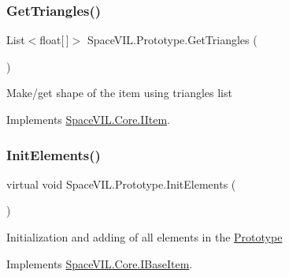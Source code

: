\subsubsection{\texorpdfstring{Get\+Triangles()}{GetTriangles()}}
{\footnotesize\ttfamily List$<$float\mbox{[}$\,$\mbox{]}$>$ Space\+V\+I\+L.\+Prototype.\+Get\+Triangles (\begin{DoxyParamCaption}{ }\end{DoxyParamCaption})}



Make/get shape of the item using triangles list 



Implements \mbox{\hyperlink{interface_space_v_i_l_1_1_core_1_1_i_item}{Space\+V\+I\+L.\+Core.\+I\+Item}}.

\mbox{\label{class_space_v_i_l_1_1_prototype_ac3379fe02923ee155b5b0084abf27420}} 
\subsubsection{\texorpdfstring{Init\+Elements()}{InitElements()}}
{\footnotesize\ttfamily virtual void Space\+V\+I\+L.\+Prototype.\+Init\+Elements (\begin{DoxyParamCaption}{ }\end{DoxyParamCaption})\hspace{0.3cm}{\ttfamily [virtual]}}



Initialization and adding of all elements in the \mbox{\hyperlink{class_space_v_i_l_1_1_prototype}{Prototype}} 



Implements \mbox{\hyperlink{interface_space_v_i_l_1_1_core_1_1_i_base_item}{Space\+V\+I\+L.\+Core.\+I\+Base\+Item}}.




